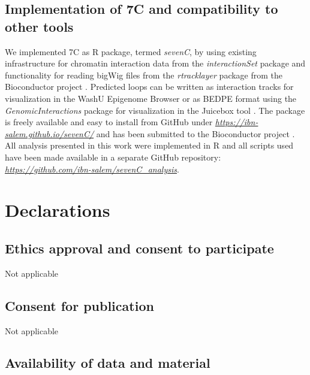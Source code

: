 \documentclass[a4paper,twoside=true,openright,parskip=full,chapterprefix=true,11pt,headings=normal,bibliography=totoc,listof=totoc,titlepage=on,captions=tableabove,draft=false]{scrreprt}
\theoremstyle{definition}
\theoremstyle{definition}
\theoremstyle{definition}
\theoremstyle{remark}
\begin{document}
\hypertarget{implementation-of-7c-and-compatibility-to-other-tools}{%
\subsection{Implementation of 7C and compatibility to other
tools}\label{implementation-of-7c-and-compatibility-to-other-tools}}

We implemented 7C as R package, termed \emph{sevenC}, by using existing
infrastructure for chromatin interaction data from the
\emph{interactionSet} package \citep{Lun2016} and functionality for
reading bigWig files from the \emph{rtracklayer} package
\citep{Lawrence2009} from the Bioconductor project \citep{Huber2015}.
Predicted loops can be written as interaction tracks for visualization
in the WashU Epigenome Browser \citep{Zhou2013} or as BEDPE format using
the \emph{GenomicInteractions} package \citep{Harmston2015} for
visualization in the Juicebox tool \citep{Durand2016}. The package is
freely available and easy to install from GitHub under
\href{https://ibn-salem.github.io/sevenC/}{\emph{https://ibn-salem.github.io/sevenC/}}
and has been submitted to the Bioconductor project \citep{Huber2015}.
All analysis presented in this work were implemented in R and all
scripts used have been made available in a separate GitHub repository:
\href{https://github.com/ibn-salem/chromloop_analysis}{\emph{https://github.com/ibn-salem/sevenC\_analysis}}.

\hypertarget{declarations-1}{%
\section{Declarations}\label{declarations-1}}

\hypertarget{ethics-approval-and-consent-to-participate-1}{%
\subsection{Ethics approval and consent to
participate}\label{ethics-approval-and-consent-to-participate-1}}

Not applicable

\hypertarget{consent-for-publication-1}{%
\subsection{Consent for publication}\label{consent-for-publication-1}}

Not applicable

\hypertarget{availability-of-data-and-material-1}{%
\subsection{Availability of data and
material}\label{availability-of-data-and-material-1}}
\end{document}

